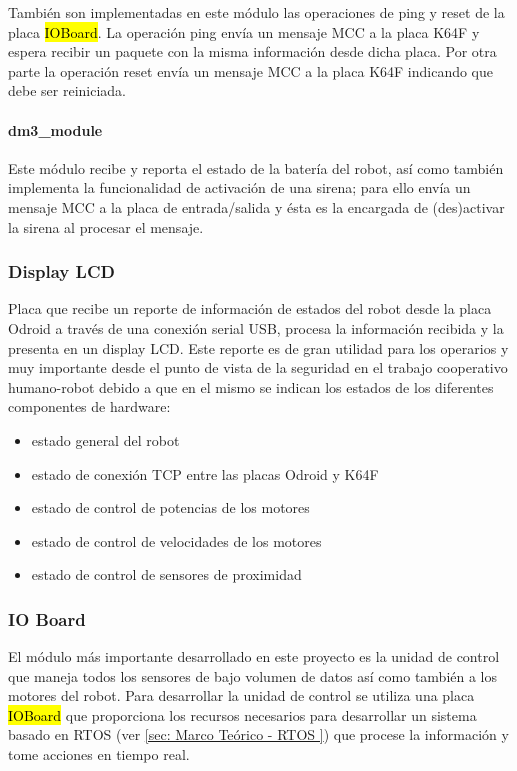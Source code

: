 \documentclass[withindex,glossary]{cam-thesis}
\begin{document}
También son implementadas en este módulo las operaciones de ping y reset de la placa \hl{IOBoard}. La operación ping envía un mensaje MCC a la placa K64F y espera recibir un paquete con la misma información desde dicha placa. Por otra parte la operación reset envía un mensaje MCC a la placa K64F indicando que debe ser reiniciada.

\paragraph{dm3\_module}
Este módulo recibe y reporta el estado de la batería del robot, así como también implementa la funcionalidad de activación de una sirena; para ello envía un mensaje MCC a la placa de entrada/salida y ésta es la encargada de (des)activar la sirena al procesar el mensaje.

\subsubsection{Display LCD}
Placa que recibe un reporte de información de estados del robot desde la placa Odroid a través de una conexión serial USB, procesa la información recibida y la presenta en un display LCD. Este reporte es de gran utilidad para los operarios y muy importante desde el punto de vista de la seguridad en el trabajo cooperativo humano-robot debido a que en el mismo se indican los estados de los diferentes componentes de hardware:
\begin{itemize}
\item estado general del robot
\item estado de conexión TCP entre las placas Odroid y K64F
\item estado de control de potencias de los motores
\item estado de control de velocidades de los motores
\item estado de control de sensores de proximidad
\end{itemize}

\subsubsection{IO Board}
El módulo más importante desarrollado en este proyecto es la unidad de control que maneja todos los sensores de bajo volumen de datos así como también a los motores del robot.
Para desarrollar la unidad de control se utiliza una placa \hl{IOBoard} que proporciona los recursos necesarios para desarrollar un sistema basado en RTOS (ver \ref{sec: Marco Teórico - RTOS }) que procese la información y tome acciones en tiempo real.
\end{document}
